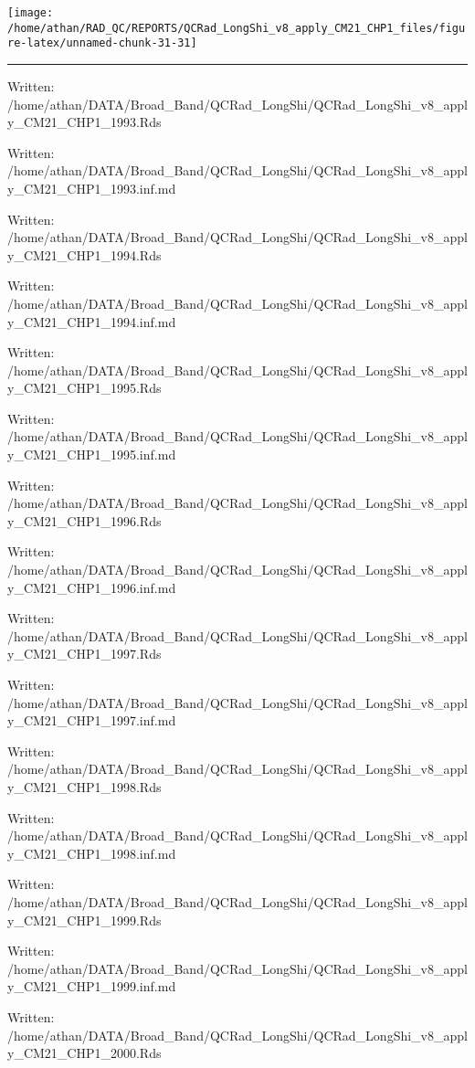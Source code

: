 \documentclass[
  10pt,
  a4paper,oneside]{article}
\begin{document}
\begin{center}\texttt{[image: /home/athan/RAD\_QC/REPORTS/QCRad\_LongShi\_v8\_apply\_CM21\_CHP1\_files/figure-latex/unnamed-chunk-31-31]} \end{center}

\begin{center}\rule{0.5\linewidth}{0.5pt}\end{center}

Written: /home/athan/DATA/Broad\_Band/QCRad\_LongShi/QCRad\_LongShi\_v8\_apply\_CM21\_CHP1\_1993.Rds

Written: /home/athan/DATA/Broad\_Band/QCRad\_LongShi/QCRad\_LongShi\_v8\_apply\_CM21\_CHP1\_1993.inf.md

Written: /home/athan/DATA/Broad\_Band/QCRad\_LongShi/QCRad\_LongShi\_v8\_apply\_CM21\_CHP1\_1994.Rds

Written: /home/athan/DATA/Broad\_Band/QCRad\_LongShi/QCRad\_LongShi\_v8\_apply\_CM21\_CHP1\_1994.inf.md

Written: /home/athan/DATA/Broad\_Band/QCRad\_LongShi/QCRad\_LongShi\_v8\_apply\_CM21\_CHP1\_1995.Rds

Written: /home/athan/DATA/Broad\_Band/QCRad\_LongShi/QCRad\_LongShi\_v8\_apply\_CM21\_CHP1\_1995.inf.md

Written: /home/athan/DATA/Broad\_Band/QCRad\_LongShi/QCRad\_LongShi\_v8\_apply\_CM21\_CHP1\_1996.Rds

Written: /home/athan/DATA/Broad\_Band/QCRad\_LongShi/QCRad\_LongShi\_v8\_apply\_CM21\_CHP1\_1996.inf.md

Written: /home/athan/DATA/Broad\_Band/QCRad\_LongShi/QCRad\_LongShi\_v8\_apply\_CM21\_CHP1\_1997.Rds

Written: /home/athan/DATA/Broad\_Band/QCRad\_LongShi/QCRad\_LongShi\_v8\_apply\_CM21\_CHP1\_1997.inf.md

Written: /home/athan/DATA/Broad\_Band/QCRad\_LongShi/QCRad\_LongShi\_v8\_apply\_CM21\_CHP1\_1998.Rds

Written: /home/athan/DATA/Broad\_Band/QCRad\_LongShi/QCRad\_LongShi\_v8\_apply\_CM21\_CHP1\_1998.inf.md

Written: /home/athan/DATA/Broad\_Band/QCRad\_LongShi/QCRad\_LongShi\_v8\_apply\_CM21\_CHP1\_1999.Rds

Written: /home/athan/DATA/Broad\_Band/QCRad\_LongShi/QCRad\_LongShi\_v8\_apply\_CM21\_CHP1\_1999.inf.md

Written: /home/athan/DATA/Broad\_Band/QCRad\_LongShi/QCRad\_LongShi\_v8\_apply\_CM21\_CHP1\_2000.Rds
\end{document}
